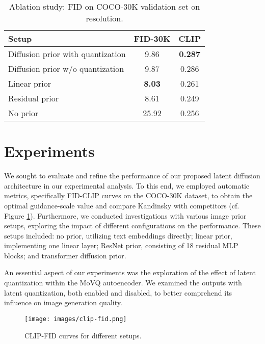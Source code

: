 \documentclass[11pt]{article}
\begin{document}
\begin{table}
\small 
  \caption{Ablation study: FID on COCO-30K validation set on  resolution.}
  \label{fid_clip_table}
  \centering
  \begin{tabular}{lcc}
    \hline
    \textbf{Setup} & \textbf{FID-30K} & \textbf{CLIP}\\ \hline
    Diffusion prior with quantization & 9.86 & \textbf{0.287} \\
    Diffusion prior w/o quantization & 9.87 & 0.286\\
    Linear prior & \textbf{8.03} & 0.261\\
    Residual prior & 8.61 & 0.249\\
    No prior & 25.92 & 0.256\\


    \hline
  \end{tabular}
\end{table}



\section{Experiments}





We sought to evaluate and refine the performance of our proposed latent diffusion architecture in our experimental analysis. To this end, we employed automatic metrics, specifically FID-CLIP curves on the COCO-30K dataset, to obtain the optimal guidance-scale value and compare Kandinsky with competitors (cf. Figure \ref{fid-clip}). Furthermore, we conducted investigations with various image prior setups, exploring the impact of different configurations on the performance. These setups included: no prior, utilizing text embeddings directly; linear prior, implementing one linear layer; ResNet prior, consisting of 18 residual MLP blocks; and transformer diffusion prior.

An essential aspect of our experiments was the exploration of the effect of latent quantization within the MoVQ autoencoder. We examined the outputs with latent quantization, both enabled and disabled, to better comprehend its influence on image generation quality.

\begin{figure}
  \centering
  \texttt{[image: images/clip-fid.png]}
  \caption{CLIP-FID curves for different setups.}
  \label{fid-clip}
\end{figure}
\end{document}
